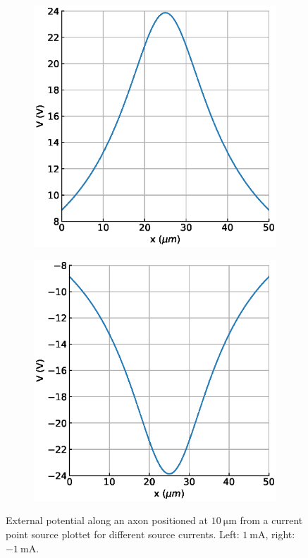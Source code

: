 \documentclass{scrartcl}			%
\begin{document}
\begin{figure}[H] 
  \begin{subfigure}[b]{0.5\linewidth}
    \centering
    \includegraphics[width=\linewidth]{imgs/external_potential_0.eps} 
    \label{fig:ext0} 
  \end{subfigure}%
  \quad
  \begin{subfigure}[b]{0.5\linewidth}
    \centering
    \includegraphics[width=\linewidth]{imgs/external_potential_1.eps} 
    \label{fig:ext1} 
    \end{subfigure} 
  \caption{External potential along an axon positioned at $\SI{10}{\micro\meter}$ from a current point source  plottet for different source currents. Left: $\SI{1}{\milli\ampere}$, right: $\SI{-1}{\milli\ampere}$.}
  \label{fig:istim} 
\end{figure}
\end{document}
